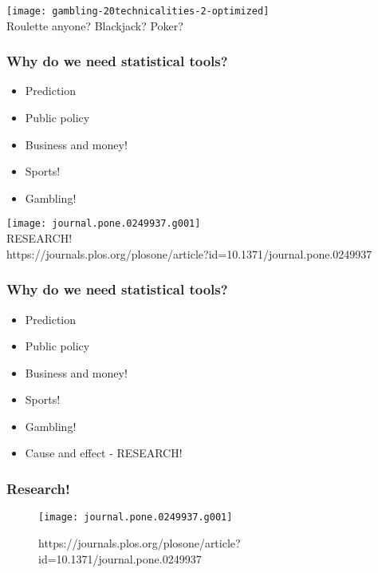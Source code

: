 \documentclass{beamer}
\begin{document}
\begin{frame}


\centering
\texttt{[image: gambling-20technicalities-2-optimized]}\\
Roulette anyone? Blackjack? Poker?



\end{frame}


\begin{frame}
\frametitle{Why do we need statistical tools?}
\begin{itemize}
\item Prediction
\item Public policy
\item Business and money!
\item Sports!
\item Gambling!
\end{itemize}
\end{frame}

\begin{frame}


\centering
\texttt{[image: journal.pone.0249937.g001]}\\

RESEARCH!\\
https://journals.plos.org/plosone/article?id=10.1371/journal.pone.0249937


\end{frame}


\begin{frame}
\frametitle{Why do we need statistical tools?}
\begin{itemize}
\item Prediction
\item Public policy
\item Business and money!
\item Sports!
\item Gambling!
\item Cause and effect - RESEARCH!
\end{itemize}

\end{frame}

\begin{frame}
\frametitle{Research!}
\begin{figure}
\centering
\texttt{[image: journal.pone.0249937.g001]}
\caption{https://journals.plos.org/plosone/article?id=10.1371/journal.pone.0249937}
\label{fig:journal}
\end{figure}

\end{frame}
\end{document}
